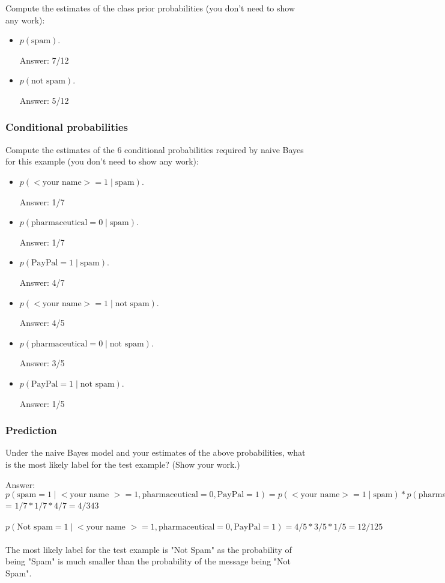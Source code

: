 \documentclass{article}
\def\ans#1{\par\gre{Answer: #1}}
\def\blu#1{{\color{blu}#1}}
\def\gre#1{{\color{gre}#1}}
\def\cond{\; | \;}
\def\items#1{\begin{itemize}#1\end{itemize}}
\begin{document}
\blu{Compute the estimates of the class prior probabilities} (you don't need to show any work):
\items{
\item$ p(\text{spam})$.
\ans{7/12}
\item $p(\text{not spam})$.
\ans{5/12}
}

\subsubsection{Conditional probabilities}

\blu{Compute the estimates of the 6 conditional probabilities required by naive Bayes for this example}  (you don't need to show any work):
\items{
\item $p(\text{$<$your name$>$} = 1  \cond \text{spam})$.
\ans{1/7}
\item $p(\text{pharmaceutical} = 0 \cond \text{spam})$.
\ans{1/7}
\item $p(\text{PayPal} = 1  \cond \text{spam})$.
\ans{4/7}
\item $p(\text{$<$your name$>$} = 1  \cond \text{not spam})$.
\ans{4/5}
\item $p(\text{pharmaceutical} = 0  \cond \text{not spam})$.
\ans{3/5}
\item $p(\text{PayPal} = 1  \cond \text{not spam})$.
\ans{1/5}
}

\subsubsection{Prediction}
\blu{Under the naive Bayes model and your estimates of the above probabilities, what is the most likely label for the test example? (Show your work.)}

\ans{$p(\text{spam} = 1 \cond \text{$<$your name $>$} = 1, \text{pharmaceutical} = 0, \text{PayPal} = 1) =p(\text{$<$your name$>$} = 1  \cond \text{spam}) *  p(\text{pharmaceutical} = 0 \cond \text{spam}) * p(\text{PayPal} = 1  \cond \text{spam})$
\\
= $1/7 * 1/7 * 4/7 = 4/343$
\\
\\
$p(\text{Not spam} = 1 \cond \text{$<$your name $>$} = 1, \text{pharmaceutical} = 0, \text{PayPal} = 1) = 4/5 * 3/5 * 1/5 = 12/125 $
\\
\\
The most likely label for the test example is "Not Spam" as the probability of being "Spam" is much smaller than the probability of the message being "Not Spam".}


\pagebreak
\end{document}
